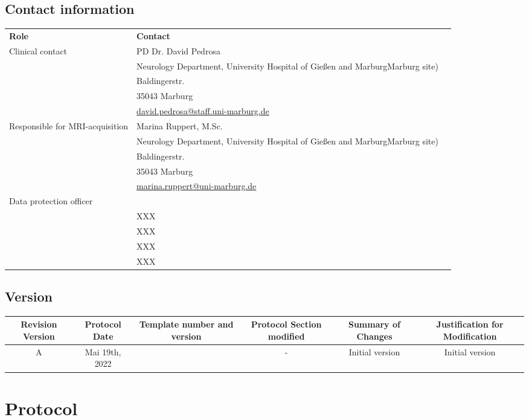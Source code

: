 \documentclass[
	a4paper, 
	11.5pt,
	headings=small, 
	twoside, 
	titlepage=firstiscover, 
 	pagesize=auto,
  	version=last,
	open=any,
	BCOR=14mm,
  	chapterprefix=false]{scrbook}
\newcommand{\UKGM}[1]{University Hospital of Gießen and Marburg}
\begin{document}
\section{Contact information}
\begin{tabularx}{0.85\textwidth}{@{}lp{8cm} *{1}{l} @{}}
\toprule
\textbf{Role} & \textbf{Contact} \\
\cmidrule{1-2}
Clinical contact 	& PD Dr. David Pedrosa \\
			& Neurology Department, \UKGM (Marburg site)\\
			& Baldingerstr.\\
			& 35043 Marburg\\
			& \href{mailto:david.pedrosa@staff.uni-marburg.de}{david.pedrosa@staff.uni-marburg.de}\\
\bottomrule
Responsible for \ac{MRI}-acquisition & Marina Ruppert, M.Sc.\\
			& Neurology Department, \UKGM (Marburg site)\\
			& Baldingerstr.\\
			& 35043 Marburg\\
			& \href{mailto:marina.ruppert@uni-marburg.de}{marina.ruppert@uni-marburg.de}\\
\bottomrule
Data protection officer & \\
			& XXX\\
			& XXX\\
			& XXX\\
			& XXX\\

\end{tabularx}
\newpage

\section{Version}
\begin{tabularx}{1\textwidth}{@{}C *{5}{C}@{}}
\toprule
\textbf{Revision Version} & \textbf{Protocol Date} & \textbf{Template number and version} & \textbf{Protocol Section modified} & \textbf{Summary of Changes} & \textbf{Justification for Modification}\\
\midrule
A & Mai 19th, 2022 &  & - & Initial version & Initial version \\

\end{tabularx}


\chapter{Protocol}
\end{document}
